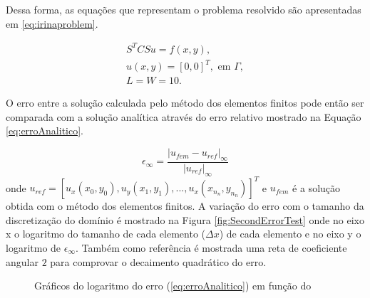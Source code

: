 Dessa forma, as equações que representam o problema resolvido são apresentadas em \eqref{eq:irinaproblem}. 

\begin{equation}\label{eq:irinaproblem}
    \begin{aligned}
        S^T C S u = f(x, y), \\
        u(x,y) = [0, 0]^T, \text{ em } \Gamma ,\\
        L = W = 10.
    \end{aligned}
\end{equation}

O erro entre a solução calculada pelo método dos elementos finitos pode então ser comparada
com a solução analítica através do erro relativo mostrado na Equação \eqref{eq:erroAnalitico}.

\begin{equation} \label{eq:erroAnalitico}
    \epsilon_{\infty} =\frac{|u_{fem} - u_{ref}|_{\infty}}{|u_{ref}|_{\infty}}
\end{equation}
onde $u_{ref} = [u_x(x_0, y_0), u_y(x_1, y_1), ..., u_x(x_{n_n}, y_{n_n})]^T$ e $u_{fem}$ é a solução obtida com o método dos elementos finitos. A variação do erro com o tamanho da discretização do domínio é mostrado na Figura  \ref{fig:SecondErrorTest} onde no eixo x o logaritmo do tamanho de cada elemento ($\Delta x$) de cada elemento e no eixo y o logaritmo de $\epsilon_{\infty}$. Também como referência é mostrada uma reta de coeficiente angular $2$ para comprovar o decaimento quadrático do erro.


\begin{figure}[h]
\center
{}
\qquad
{}
\caption{Gráficos do logaritmo do erro (\eqref{eq:erroAnalitico}) em função do }
\end{figure}
    
